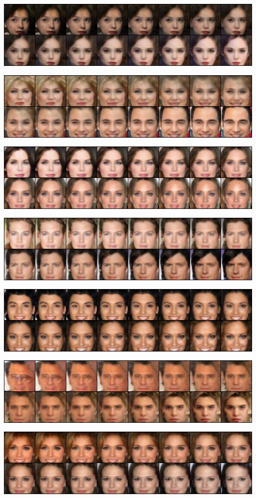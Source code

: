 \documentclass[12pt, a4paper]{article}
\begin{document}
\centerline{\includegraphics[width=0.9\paperwidth]{inter14.png}}
\centerline{\includegraphics[width=0.9\paperwidth]{inter20.png}}
\centerline{\includegraphics[width=0.9\paperwidth]{inter25.png}}
\centerline{\includegraphics[width=0.9\paperwidth]{inter29.png}}
\centerline{\includegraphics[width=0.9\paperwidth]{inter53.png}}
\centerline{\includegraphics[width=0.9\paperwidth]{inter63.png}}
\centerline{\includegraphics[width=0.9\paperwidth]{inter66.png}}
\end{document}
